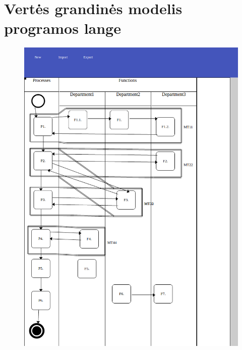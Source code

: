 \documentclass{VUMIFInfBakalaurinis}
\begin{document}
\section{Vertės grandinės modelis programos lange} \label{appendix:dvcm_window}
\begin{figure}[H]
    \centering
    \includegraphics[scale=0.6]{img/dvcm_window}
\end{figure}
\end{document}
